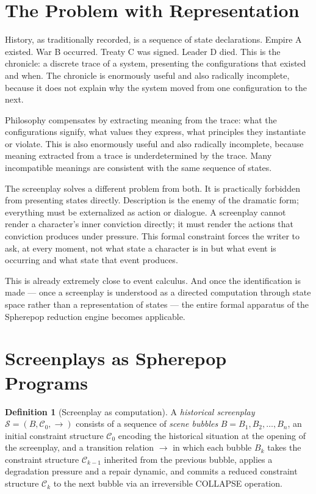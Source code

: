 \documentclass[11pt, a4paper]{article}
\theoremstyle{definition}
\newtheorem{definition}{Definition}
\theoremstyle{remark}
\begin{document}
\section{The Problem with Representation}

History, as traditionally recorded, is a sequence of state declarations.
Empire A existed. War B occurred. Treaty C was signed. Leader D died. This
is the chronicle: a discrete trace of a system, presenting the configurations
that existed and when. The chronicle is enormously useful and also radically
incomplete, because it does not explain why the system moved from one
configuration to the next.

Philosophy compensates by extracting meaning from the trace: what the
configurations signify, what values they express, what principles they
instantiate or violate. This is also enormously useful and also radically
incomplete, because meaning extracted from a trace is underdetermined by the
trace. Many incompatible meanings are consistent with the same sequence of
states.

The screenplay solves a different problem from both. It is practically
forbidden from presenting states directly. Description is the enemy of the
dramatic form; everything must be externalized as action or dialogue. A
screenplay cannot render a character's inner conviction directly; it must
render the actions that conviction produces under pressure. This formal
constraint forces the writer to ask, at every moment, not what state a
character is in but what event is occurring and what state that event produces.

This is already extremely close to event calculus. And once the identification
is made --- once a screenplay is understood as a directed computation through
state space rather than a representation of states --- the entire formal
apparatus of the Spherepop reduction engine becomes applicable.

\section{Screenplays as Spherepop Programs}

\begin{definition}[Screenplay as computation]
A \textit{historical screenplay} $\mathcal{S} = (B, \mathcal{C}_0, \to)$
consists of a sequence of \textit{scene bubbles} $B = B_1, B_2, \ldots, B_n$,
an initial constraint structure $\mathcal{C}_0$ encoding the historical
situation at the opening of the screenplay, and a transition relation
$\to$ in which each bubble $B_k$ takes the constraint structure
$\mathcal{C}_{k-1}$ inherited from the previous bubble, applies a degradation
pressure and a repair dynamic, and commits a reduced constraint structure
$\mathcal{C}_k$ to the next bubble via an irreversible COLLAPSE operation.
\end{definition}
\end{document}
